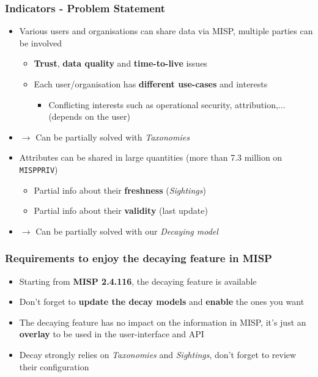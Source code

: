 \begin{frame}
\frametitle{Indicators - Problem Statement}
    \begin{itemize}
        \item Various users and organisations can share data via MISP, multiple parties can be involved
        \begin{itemize}
            \item \textbf{Trust}, \textbf{data quality} and \textbf{time-to-live} issues
            \item Each user/organisation has \textbf{different use-cases} and interests
                \begin{itemize}
                    \item Conflicting interests such as operational security, attribution,... (depends on the user)
                \end{itemize}
        \end{itemize}
        \item[] $\rightarrow$ Can be partially solved with \textit{Taxonomies}
        \pause
        \vspace{0.5cm}
        \item Attributes can be shared in large quantities (more than 7.3 million on \texttt{MISPPRIV})
        \begin{itemize}
            \item Partial info about their \textbf{freshness} (\textit{Sightings})
            \item Partial info about their \textbf{validity} (last update)
        \end{itemize}
        \item[] $\rightarrow$ Can be partially solved with our \textit{Decaying model}
    \end{itemize}
\end{frame}

\begin{frame}
\frametitle{Requirements to enjoy the decaying feature in MISP}
        \begin{itemize}
            \item Starting from \textbf{MISP 2.4.116}, the decaying feature is available
            \item Don't forget to \textbf{update the decay models} and \textbf{enable} the ones you want
            \item The decaying feature has no impact on the information in MISP, it's just an \textbf{overlay} to be used in the user-interface and API
            \item Decay strongly relies on \textit{Taxonomies} and \textit{Sightings}, don't forget to review their configuration
        \end{itemize}
\end{frame}

